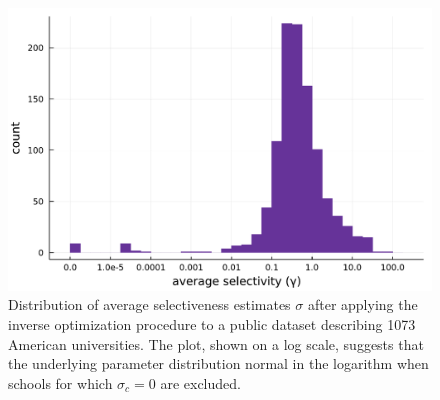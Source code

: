 \documentclass[12pt]{article}
\numberwithin{equation}{subsection}
\theoremstyle{definition}
\begin{document}
\begin{figure}
\begin{center}\includegraphics[width=\linewidth, ]{singlescoreplots/average-selectivity-hist.pdf}\end{center}
\captionsetup{singlelinecheck=off}
    \caption[.]{Distribution of average selectiveness estimates $\sigma$ after applying the inverse optimization procedure to a public dataset describing 1073 American universities. The plot, shown on a log scale, suggests that the underlying parameter distribution normal in the logarithm when schools for which $\sigma_c = 0$ are excluded.}
\label{average-selectivity-hist}
\end{figure}
\end{document}

